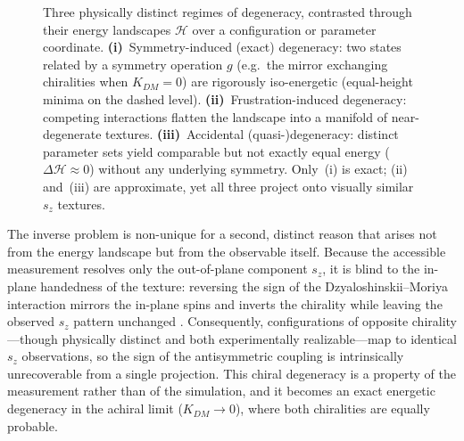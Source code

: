 \documentclass[letterpaper, 12, one column]{article}
\begin{document}
\begin{figure}[H]
{}
\caption{Three physically distinct regimes of degeneracy, contrasted through their energy landscapes $\mathcal{H}$ over a configuration or parameter coordinate. \textbf{(i)}~Symmetry-induced (exact) degeneracy: two states related by a symmetry operation $g$ (e.g.\ the mirror exchanging chiralities when $K_{DM}\!=\!0$) are rigorously iso-energetic (equal-height minima on the dashed level). \textbf{(ii)}~Frustration-induced degeneracy: competing interactions flatten the landscape into a manifold of near-degenerate textures. \textbf{(iii)}~Accidental (quasi-)degeneracy: distinct parameter sets yield comparable but not exactly equal energy ($\Delta\mathcal{H}\!\approx\!0$) without any underlying symmetry. Only~(i) is exact; (ii) and~(iii) are approximate, yet all three project onto visually similar $s_z$ textures.}
\label{fig:degeneracy_taxonomy}
\end{figure}

The inverse problem is non-unique for a second, distinct reason that arises not from the energy landscape but from the observable itself. Because the accessible measurement resolves only the out-of-plane component $s_z$, it is blind to the in-plane handedness of the texture: reversing the sign of the Dzyaloshinskii–Moriya interaction mirrors the in-plane spins and inverts the chirality while leaving the observed $s_z$ pattern unchanged \cite{MimicaFigari2020DMI}. Consequently, configurations of opposite chirality—though physically distinct and both experimentally realizable—map to identical $s_z$ observations, so the sign of the antisymmetric coupling is intrinsically unrecoverable from a single projection. This chiral degeneracy is a property of the measurement rather than of the simulation, and it becomes an exact energetic degeneracy in the achiral limit ($K_{DM}\to 0$), where both chiralities are equally probable.
\end{document}
